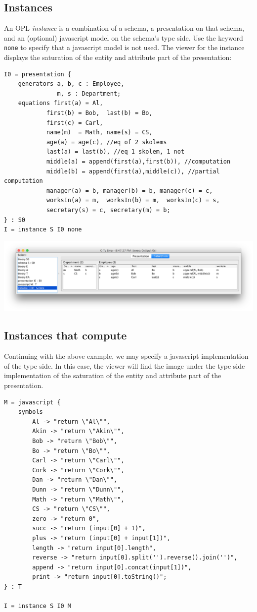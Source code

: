 \documentclass[12pt]{article}
\begin{document}
\subsection{Instances}

An OPL {\it instance} is a combination of a schema, a presentation on that schema, and an (optional) javascript model on the schema's type side.  Use the keyword {\tt none} to specify that a javascript model is not used.  The viewer for the instance displays the saturation of the entity and attribute part of the presentation:

\begin{verbatim}
I0 = presentation {
	generators a, b, c : Employee, 
	           m, s : Department;
	equations first(a) = Al, 
			first(b) = Bob,  last(b) = Bo,
			first(c) = Carl, 
			name(m)  = Math, name(s) = CS,
			age(a) = age(c), //eq of 2 skolems
			last(a) = last(b), //eq 1 skolem, 1 not
			middle(a) = append(first(a),first(b)), //computation
			middle(b) = append(first(a),middle(c)), //partial computation
			manager(a) = b, manager(b) = b, manager(c) = c,
			worksIn(a) = m,  worksIn(b) = m,  worksIn(c) = s,
			secretary(s) = c, secretary(m) = b;
} : S0
I = instance S I0 none
\end{verbatim}

\begin{center}
\includegraphics[width=6in]{instance1}
\end{center}

\subsection{Instances that compute}

Continuing with the above example, we may specify a javascript implementation of the type side.  In this case, the viewer will find the image under the type side implementation of the saturation of the entity and attribute part of the presentation. 

\begin{verbatim}
M = javascript {
	symbols
		Al -> "return \"Al\"",
		Akin -> "return \"Akin\"",
		Bob -> "return \"Bob\"",
		Bo -> "return \"Bo\"",
		Carl -> "return \"Carl\"",
		Cork -> "return \"Cork\"",
		Dan -> "return \"Dan\"",
		Dunn -> "return \"Dunn\"",
		Math -> "return \"Math\"",
		CS -> "return \"CS\"",
		zero -> "return 0",
		succ -> "return (input[0] + 1)",
		plus -> "return (input[0] + input[1])",
		length -> "return input[0].length",
		reverse -> "return input[0].split('').reverse().join('')",
		append -> "return input[0].concat(input[1])",
		print -> "return input[0].toString()";
} : T

I = instance S I0 M
\end{verbatim}
\end{document}
